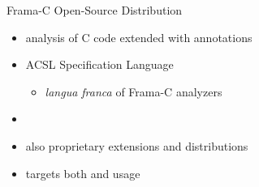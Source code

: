 \begin{frame}[fragile]{Frama-C Open-Source Distribution}

\begin{center}
  \large{}
  
  {\small {}}
\end{center}
\vspace{-1mm}

\begin{itemize}
\item analysis of C code extended with  annotations
\smallskip
\item ACSL Specification Language
  \begin{itemize}
  \item {\it langua franca} of Frama-C analyzers
  \end{itemize}
\item {}  
\begin{center}
  \large{}
\end{center}
\smallskip
\item also proprietary extensions and distributions
\smallskip
\item targets both  and  usage
\end{itemize}



\end{frame}
